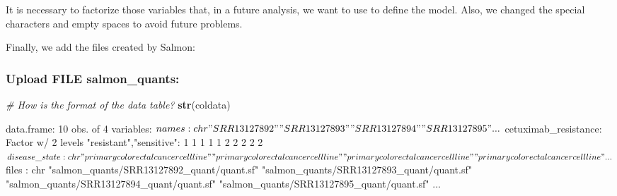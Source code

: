 \documentclass[
]{article}
\newenvironment{Shaded}{\begin{snugshade}}{\end{snugshade}}
\newcommand{\CommentTok}[1]{\textcolor[rgb]{0.56,0.35,0.01}{\textit{#1}}}
\newcommand{\FunctionTok}[1]{\textcolor[rgb]{0.13,0.29,0.53}{\textbf{#1}}}
\newcommand{\NormalTok}[1]{#1}
\newcommand{\OtherTok}[1]{\textcolor[rgb]{0.56,0.35,0.01}{#1}}
\newcommand{\SpecialCharTok}[1]{\textcolor[rgb]{0.81,0.36,0.00}{\textbf{#1}}}
\newcommand{\StringTok}[1]{\textcolor[rgb]{0.31,0.60,0.02}{#1}}
\begin{document}
It is necessary to factorize those variables that, in a future analysis,
we want to use to define the model. Also, we changed the special
characters and empty spaces to avoid future problems.

\begin{Shaded}
\end{Shaded}

Finally, we add the files created by Salmon:

\begin{Shaded}
\end{Shaded}

\subsubsection{Upload FILE
salmon\_quants:}\label{upload-file-salmon_quants}

\begin{Shaded}
\begin{Highlighting}[]
\CommentTok{\# How is the format of the data table?}
\FunctionTok{str}\NormalTok{(coldata)}
\end{Highlighting}
\end{Shaded}

\begin{Shaded}
\begin{Highlighting}[]
\NormalTok{\textquotesingle{}data.frame\textquotesingle{}:   10 obs. of  4 variables:}
\NormalTok{ $ names               : chr  "SRR13127892" "SRR13127893" "SRR13127894" "SRR13127895" ...}
\NormalTok{ $ cetuximab\_resistance: Factor w/ 2 levels "resistant","sensitive": 1 1 1 1 1 2 2 2 2 2}
\NormalTok{ $ disease\_state       : chr  "primary colorectal cancer cell line" "primary colorectal cancer cell line" "primary colorectal cancer cell line" "primary colorectal cancer cell line" ...}
\NormalTok{ $ files               : chr  "salmon\_quants/SRR13127892\_quant/quant.sf" "salmon\_quants/SRR13127893\_quant/quant.sf" "salmon\_quants/SRR13127894\_quant/quant.sf" "salmon\_quants/SRR13127895\_quant/quant.sf" ...}
\end{Highlighting}
\end{Shaded}
\end{document}
